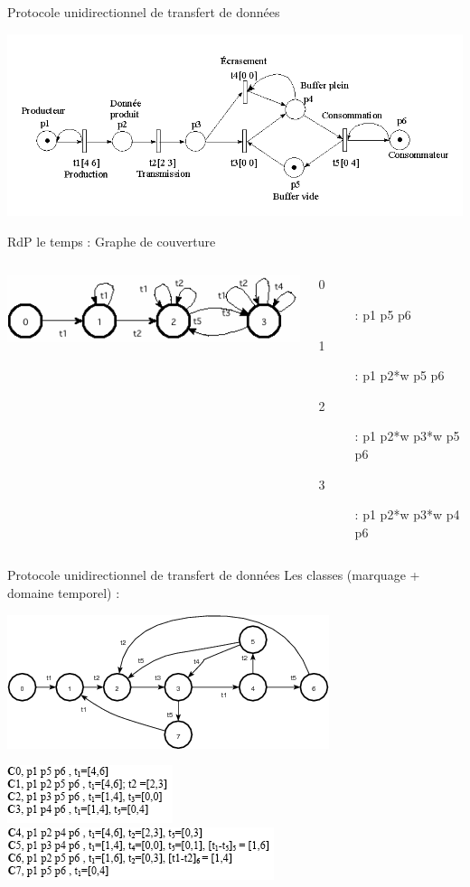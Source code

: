 \documentclass[compress]{beamer}
\begin{document}
\begin{frame}{Protocole unidirectionnel de transfert de données}
\centerline{\includegraphics[width=.7\linewidth]{rdp_exo}}
RdP  le temps : Graphe de couverture\\
\begin{columns}
\begin{column}{.4\linewidth}
	\includegraphics[width=1.2\linewidth]{ExIfac_gCk}
\end{column}
\begin{column}{.6\linewidth}
	\begin{description}
	\item[0] : p1 p5 p6\\
	\item[1] : p1 p2*w p5 p6\\
	\item[2] : p1 p2*w p3*w p5 p6\\
	\item[3] : p1 p2*w p3*w p4 p6\\
	\end{description}
\end{column}
\end{columns}
\end{frame} 

\begin{frame}{Protocole unidirectionnel de transfert de données}
Les classes (marquage + domaine temporel) :
\begin{center}
	\includegraphics[width=.6\linewidth]{w}
\end{center}
\includegraphics[width=.4\linewidth]{clas1}\\
\includegraphics[width=.6\linewidth]{cla2}
\end{frame}
\end{document}
